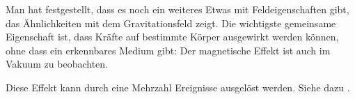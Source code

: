 




%
%	






Man hat festgestellt, dass es noch ein weiteres Etwas mit Feldeigenschaften gibt, das Ähnlichkeiten mit dem Gravitationsfeld zeigt. Die wichtigste gemeinsame Eigenschaft ist, dass Kräfte auf bestimmte Körper ausgewirkt werden können, ohne dass ein erkennbares Medium gibt: Der magnetische Effekt ist auch im Vakuum zu beobachten. 

Diese Effekt kann durch eine Mehrzahl Ereignisse ausgelöst werden. Siehe dazu .




